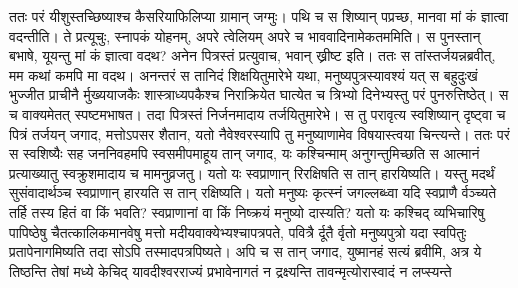 \vakya ततः परं यीशुस्तच्छिष्याश्च कैसरियाफिलिप्या ग्रामान् जग्मुः। पथि च स शिष्यान् पप्रच्छ, मानवा मां कं ज्ञात्वा वदन्तीति।
\vakya ते प्रत्यूचुः, स्नापकं योहनम्, अपरे त्वेलियम् अपरे च भाववादिनामेकतममिति। स पुनस्तान् बभाषे,
\vakya यूयन्तु मां कं ज्ञात्वा वदथ? अनेन पित्रस्तं प्रत्युवाच, भवान् ख्रीष्ट इति।
\vakya ततः स तांस्तर्जयन्नब्रवीत्, मम कथां कमपि मा वदथ।
\vakya अनन्तरं स तानिदं शिक्षयितुमारेभे यथा, मनुष्यपुत्रस्यावश्यं यत् स बहुदुःखं भुज्जीत प्राचीनै र्मुख्ययाजकैः शास्त्राध्यपकैश्च निराक्रियेत घात्येत च त्रिभ्यो दिनेभ्यस्तु परं पुनरुत्तिष्ठेत्।
\vakya स च वाक्यमेतत् स्पष्टमभाषत। तदा पित्रस्तं निर्जनमादाय तर्जयितुमारेभे।
\vakya स तु परावृत्य स्वशिष्यान् दृष्ट्वा च पित्रं तर्जयन् जगाद, मत्तोऽपसर शैतान, यतो नैवेश्वरस्यापि तु मनुष्याणामेव विषयास्त्वया चिन्त्यन्ते।
\vakya ततः परं स स्वशिष्यैः सह जननिवहमपि स्वसमीपमाहूय तान् जगाद, यः कश्चिन्माम् अनुगन्तुमिच्छति स आत्मानं प्रत्याख्यातु स्वक्रुशमादाय च मामनुव्रजतु।
\vakya यतो यः स्वप्राणान् रिरक्षिषति स तान् हारयिष्यति। यस्तु मदर्थं सुसंवादार्थञ्च स्वप्राणान् हारयति स तान् रक्षिष्यति।
\vakya यतो मनुष्यः कृत्स्नं जगल्लब्ध्वा यदि स्वप्राणै र्वञ्च्यते तर्हि तस्य हितं वा किं भवति?
\vakya स्वप्राणानां वा किं निष्क्रयं मनुष्यो दास्यति?
\vakya यतो यः कश्चिद् व्यभिचारिषु पापिष्ठेषु चैतत्कालिकमानवेषु मत्तो मदीयवाक्येभ्यश्चापत्रपते, पवित्रै र्दूतै र्वृतो मनुष्यपुत्रो यदा स्वपितुः प्रतापेनागमिष्यति तदा सोऽपि तस्मादपत्रपिष्यते।
\vakya अपि च स तान् जगाद, युष्मानहं सत्यं ब्रवीमि, अत्र ये तिष्ठन्ति तेषां मध्ये केचिद् यावदीश्वरराज्यं प्रभावेनागतं न द्रक्ष्यन्ति तावन्मृत्योरास्वादं न लप्स्यन्ते\eoc